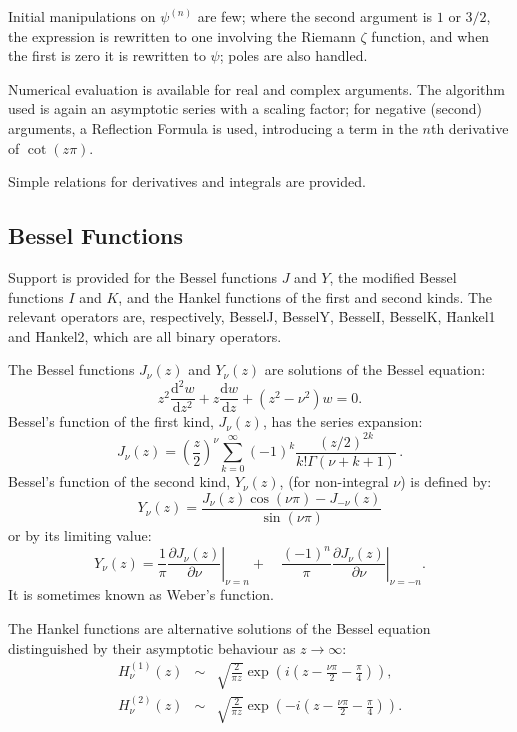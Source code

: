 Initial manipulations on $\psi^{(n)}$ are few; where the second argument
is $1$ or $3/2$, the expression is rewritten to one involving the
Riemann $\zeta$ function, and when the first is zero it is rewritten to
$\psi$; poles are also handled.

Numerical evaluation is available for real and complex arguments. The
algorithm used is again an asymptotic series with a scaling factor; for
negative (second) arguments, a Reflection Formula is used, introducing a
term in the $n$th derivative of $\cot(z\pi)$.

Simple relations for derivatives and integrals are provided.

\subsection{Bessel Functions}
\hypertarget{operator:BESSELI}{}
\hypertarget{operator:BESSELJ}{}
\hypertarget{operator:BESSELK}{}
\hypertarget{operator:BESSELY}{}
\hypertarget{operator:HANKEL1}{}
\hypertarget{operator:HANKEL2}{}
\hypertarget{BESSELF}{}

Support is provided for the Bessel functions $J$ and $Y$, the modified
Bessel functions $I$ and $K$, and the Hankel functions of the first and
second kinds.  The relevant operators are, respectively, \f{BesselJ},
\f{BesselY}, \f{BesselI}, \f{BesselK}, \f{Hankel1} and \f{Hankel2}, 
which are all binary operators.

The Bessel functions $J_\nu(z)$ and $Y_\nu(z)$ are solutions of the Bessel
equation:
$$z^2\frac{\mathrm{d}^2w}{\mathrm{d}z^2}+z\frac{\mathrm{d}w}{\mathrm{d}z} +
(z^2 - \nu^2)w = 0.$$
Bessel's function of the first kind, $J_\nu(z)$, has the series expansion:
$$J_\nu(z) = \left(\frac{z}{2}\right)^\nu \sum_{k=0}^\infty (-1)^k
\frac{(z/2)^{2k}}{k! \Gamma(\nu + k+1)}\,.$$
Bessel's function of the second kind, $Y_\nu(z)$, (for non-integral $\nu$) is
defined by:
$$Y_\nu(z) = \frac{J_\nu(z) \cos(\nu\pi)-J_{-\nu}(z)}{\sin(\nu\pi)}$$
or by its limiting value:
$$Y_\nu(z) =
\left.\frac{1}{\pi}\frac{\partial{J_\nu(z)}}{\partial\nu}\right|_{\nu=n} +\quad
\left.\frac{(-1)^n}{\pi}\frac{\partial{J_\nu(z)}}{\partial \nu}\right|_{\nu=-n}. $$
It is sometimes known as Weber's function.

The Hankel functions are alternative solutions of the Bessel equation
distinguished by their asymptotic behaviour as $z\rightarrow \infty$:
\begin{eqnarray*}
H_\nu^{(1)}(z) & \sim & \sqrt{\frac{2}{\pi z}}\exp\left(i\left(z-\frac{\nu\pi}
{2}-\frac{\pi}{4}\right)\right),\\
H_\nu^{(2)}(z) & \sim & \sqrt{\frac{2}{\pi z}}\exp\left(-i\left(z-\frac{\nu\pi}
{2}-\frac{\pi}{4}\right)\right).
\end{eqnarray*}

